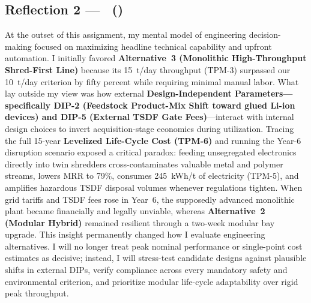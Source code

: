 \subsection{Reflection 2 --- \memberTwoName\ (\texttt{\memberTwoRoll})}
At the outset of this assignment, my mental model of engineering decision-making focused on maximizing headline technical capability and upfront automation. I initially favored \textbf{Alternative~3 (Monolithic High-Throughput Shred-First Line)} because its 15~t/day throughput (TPM-3) surpassed our 10~t/day criterion by fifty percent while requiring minimal manual labor. What lay outside my view was how external \textbf{Design-Independent Parameters---specifically DIP-2 (Feedstock Product-Mix Shift toward glued Li-ion devices) and DIP-5 (External TSDF Gate Fees)}---interact with internal design choices to invert acquisition-stage economics during utilization. Tracing the full 15-year \textbf{Levelized Life-Cycle Cost (TPM-6)} and running the Year-6 disruption scenario exposed a critical paradox: feeding unsegregated electronics directly into twin shredders cross-contaminates valuable metal and polymer streams, lowers MRR to 79\%, consumes 245~kWh/t of electricity (TPM-5), and amplifies hazardous TSDF disposal volumes whenever regulations tighten. When grid tariffs and TSDF fees rose in Year~6, the supposedly advanced monolithic plant became financially and legally unviable, whereas \textbf{Alternative~2 (Modular Hybrid)} remained resilient through a two-week modular bay upgrade. This insight permanently changed how I evaluate engineering alternatives. I will no longer treat peak nominal performance or single-point cost estimates as decisive; instead, I will stress-test candidate designs against plausible shifts in external DIPs, verify compliance across every mandatory safety and environmental criterion, and prioritize modular life-cycle adaptability over rigid peak throughput.

